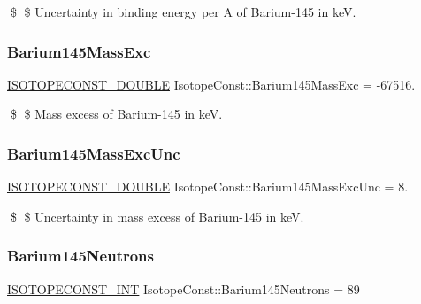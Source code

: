 \$ \$ Uncertainty in binding energy per A of Barium-\/145 in keV. \mbox{\label{group___isotope_const-_barium-_ba145_gab01d6a3d41a78481c30eefb22750f7ea}} 
\subsubsection{\texorpdfstring{Barium145\+Mass\+Exc}{Barium145MassExc}}
{\footnotesize\ttfamily \mbox{\hyperlink{group___isotope_const-_macros_ga8f45a7272ce02c0b4c65c44636ed719a}{I\+S\+O\+T\+O\+P\+E\+C\+O\+N\+S\+T\+\_\+\+D\+O\+U\+B\+LE}} Isotope\+Const\+::\+Barium145\+Mass\+Exc = -\/67516.}

\$ \$ Mass excess of Barium-\/145 in keV. \mbox{\label{group___isotope_const-_barium-_ba145_ga3ae124c421a56cdacd0f358e331cd49a}} 
\subsubsection{\texorpdfstring{Barium145\+Mass\+Exc\+Unc}{Barium145MassExcUnc}}
{\footnotesize\ttfamily \mbox{\hyperlink{group___isotope_const-_macros_ga8f45a7272ce02c0b4c65c44636ed719a}{I\+S\+O\+T\+O\+P\+E\+C\+O\+N\+S\+T\+\_\+\+D\+O\+U\+B\+LE}} Isotope\+Const\+::\+Barium145\+Mass\+Exc\+Unc = 8.}

\$ \$ Uncertainty in mass excess of Barium-\/145 in keV. \mbox{\label{group___isotope_const-_barium-_ba145_gae8b62838e8384e742a4b69158ff186b2}} 
\subsubsection{\texorpdfstring{Barium145\+Neutrons}{Barium145Neutrons}}
{\footnotesize\ttfamily \mbox{\hyperlink{group___isotope_const-_macros_ga5f18360b3e99483a35c32d789e62621c}{I\+S\+O\+T\+O\+P\+E\+C\+O\+N\+S\+T\+\_\+\+I\+NT}} Isotope\+Const\+::\+Barium145\+Neutrons = 89}

